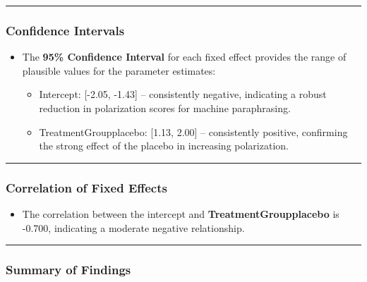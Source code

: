 \documentclass[
]{article}
\providecommand{\tightlist}{%
  \setlength{\itemsep}{0pt}\setlength{\parskip}{0pt}}
\begin{document}
\begin{center}\rule{0.5\linewidth}{0.5pt}\end{center}

\subsubsection{\texorpdfstring{\textbf{Confidence
Intervals}}{Confidence Intervals}}\label{confidence-intervals-2}

\begin{itemize}
\tightlist
\item
  The \textbf{95\% Confidence Interval} for each fixed effect provides
  the range of plausible values for the parameter estimates:

  \begin{itemize}
  \tightlist
  \item
    Intercept: {[}-2.05, -1.43{]} -- consistently negative, indicating a
    robust reduction in polarization scores for machine paraphrasing.
  \item
    TreatmentGroupplacebo: {[}1.13, 2.00{]} -- consistently positive,
    confirming the strong effect of the placebo in increasing
    polarization.
  \end{itemize}
\end{itemize}

\begin{center}\rule{0.5\linewidth}{0.5pt}\end{center}

\subsubsection{\texorpdfstring{\textbf{Correlation of Fixed
Effects}}{Correlation of Fixed Effects}}\label{correlation-of-fixed-effects-2}

\begin{itemize}
\tightlist
\item
  The correlation between the intercept and
  \textbf{TreatmentGroupplacebo} is -0.700, indicating a moderate
  negative relationship.
\end{itemize}

\begin{center}\rule{0.5\linewidth}{0.5pt}\end{center}

\subsubsection{\texorpdfstring{\textbf{Summary of
Findings}}{Summary of Findings}}\label{summary-of-findings-2}
\end{document}
